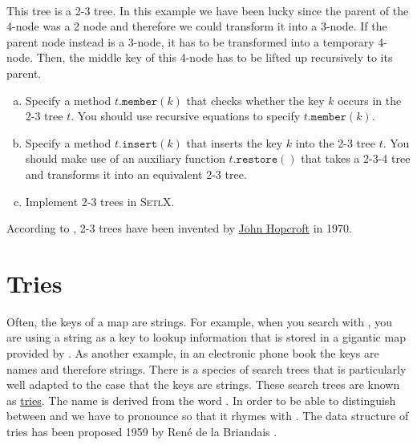 \\[0.2cm]
This tree is a 2-3 tree.  In this example we have been lucky since the parent of the 4-node was
a 2 node and therefore we could transform it into a 3-node.  If the parent node instead is a 3-node,
it has to be transformed into a temporary 4-node.  Then, the middle key of this 4-node has to be
lifted up recursively to its parent.  
\begin{enumerate}[(a)]
\item Specify a method $t.\mathtt{member}(k)$ that checks whether the key $k$ occurs in the 2-3 tree
      $t$.  You should use recursive equations to specify  $t.\mathtt{member}(k)$.
\item Specify a method $t.\mathtt{insert}(k)$ that inserts the key $k$ into the 2-3 tree
      $t$.  You should make use of an auxiliary function $t.\mathtt{restore}()$ that takes a 2-3-4
      tree and transforms it into an equivalent 2-3 tree.
\item Implement 2-3 trees in \textsc{SetlX}.
\end{enumerate}
According to \cite{cormen:09}, 2-3 trees have been invented by
\href{https://en.wikipedia.org/wiki/John_Hopcroft}{John Hopcroft} in 1970.



\section{Tries}
Often, the keys of a map are strings.  For example, when you search with 
\href{https://www.google.com}{}, you are using
a string as a key to lookup information that is stored in a gigantic map provided by .
As another example, in an electronic phone book the keys are names and therefore strings.  
There is a species of search trees that is particularly well adapted to the case that the keys are
strings.  These search trees are known as \href{https://en.wikipedia.org/?title=Trie}{tries}.  
The name is derived from the word
.  In order to be able to distinguish between  and
 we have to pronounce    so that it rhymes with .   The data
structure of tries has been proposed 1959 by Ren\'e de la Briandais \cite{briandais:59}.

